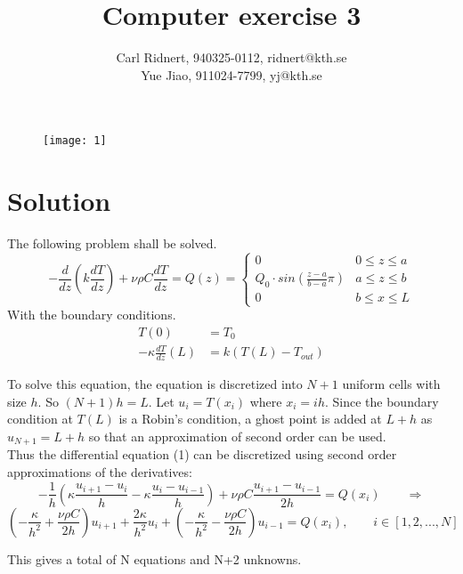 \documentclass[11pt,a4paper,roman]{scrartcl}
\title{Computer exercise 3}
\date{}
\author{Carl Ridnert, 940325-0112, ridnert@kth.se \\
Yue Jiao, 911024-7799, yj@kth.se}
\begin{document}
\maketitle
\begin{figure}[h]
\centering
\texttt{[image: 1]}
\end{figure}
\newpage

\section*{Solution}
The following problem shall be solved. 
\begin{equation}
-\frac{d}{dz}\left(k\frac{dT}{dz}\right)+\nu \rho C \frac{dT}{dz} = Q(z)
=
\begin{cases} 
      0 & 0\leq z\leq a \\
      Q_0 \cdot sin(\frac{z-a}{b-a}\pi) & a\leq z\leq b \\
      0 & b\leq x \leq L
   \end{cases}
\end{equation}
With the boundary conditions. 
\begin{equation}
\begin{aligned}
T(0) & =T_0 \\ -\kappa \frac{dT}{dz}(L) & = k(T(L)-T_{out})
\end{aligned}
\end{equation}

To solve this equation, the equation is discretized into $N+1$ uniform cells with size $h$. So $(N+1)h=L$. Let $u_i = T(x_i)$ where $x_i = ih$. Since the boundary condition at $T(L)$ is a Robin's condition, a ghost point is added at $L+h$ as $u_{N+1}=L+h$ so that an approximation of second order can be used. \\

Thus the differential equation (1) can be discretized using second order approximations of the derivatives: 
\begin{equation}
-\frac{1}{h}(\kappa\frac{u_{i+1}-u_{i}}{h}-\kappa\frac{u_{i}-u_{i-1}}{h}) + \nu\rho C \frac{u_{i+1}-u_{i-1}}{2h} = Q(x_i) \qquad  \Rightarrow
\end{equation}
\begin{equation}
(-\frac{\kappa}{h^2}+\frac{\nu\rho C}{2h})u_{i+1} + \frac{2\kappa}{h^2}u_i + (-\frac{\kappa}{h^2}-\frac{\nu\rho C}{2h})u_{i-1} = Q(x_i), \qquad i\in[1, 2, ..., N]
\end{equation}

This gives a total of N equations and N+2 unknowns. 
\end{document}
